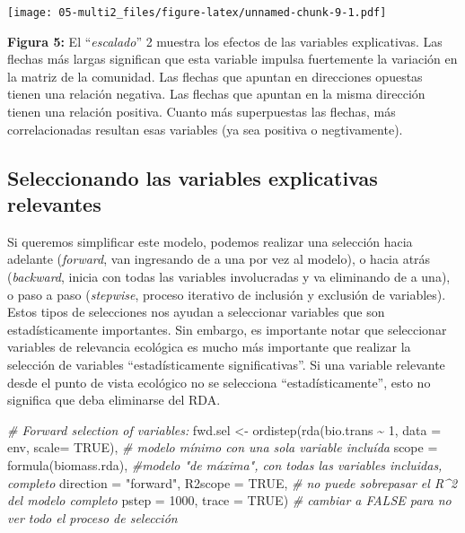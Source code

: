 \documentclass[
]{book}
\newenvironment{Shaded}{\begin{snugshade}}{\end{snugshade}}
\newcommand{\AttributeTok}[1]{\textcolor[rgb]{0.77,0.63,0.00}{#1}}
\newcommand{\CommentTok}[1]{\textcolor[rgb]{0.56,0.35,0.01}{\textit{#1}}}
\newcommand{\ConstantTok}[1]{\textcolor[rgb]{0.00,0.00,0.00}{#1}}
\newcommand{\DecValTok}[1]{\textcolor[rgb]{0.00,0.00,0.81}{#1}}
\newcommand{\FunctionTok}[1]{\textcolor[rgb]{0.00,0.00,0.00}{#1}}
\newcommand{\NormalTok}[1]{#1}
\newcommand{\OtherTok}[1]{\textcolor[rgb]{0.56,0.35,0.01}{#1}}
\newcommand{\SpecialCharTok}[1]{\textcolor[rgb]{0.00,0.00,0.00}{#1}}
\newcommand{\StringTok}[1]{\textcolor[rgb]{0.31,0.60,0.02}{#1}}
\begin{document}
\texttt{[image: 05-multi2\_files/figure-latex/unnamed-chunk-9-1.pdf]}

\textbf{Figura 5:} El ``\emph{escalado}'' 2 muestra los efectos de las variables explicativas. Las flechas más largas significan que esta variable impulsa fuertemente la variación en la matriz de la comunidad. Las flechas que apuntan en direcciones opuestas tienen una relación negativa. Las flechas que apuntan en la misma dirección tienen una relación positiva. Cuanto más superpuestas las flechas, más correlacionadas resultan esas variables (ya sea positiva o negtivamente).

\hypertarget{seleccionando-las-variables-explicativas-relevantes}{%
\subsection{Seleccionando las variables explicativas relevantes}\label{seleccionando-las-variables-explicativas-relevantes}}

Si queremos simplificar este modelo, podemos realizar una selección hacia adelante (\emph{forward}, van ingresando de a una por vez al modelo), o hacia atrás (\emph{backward}, inicia con todas las variables involucradas y va eliminando de a una), o paso a paso (\emph{stepwise}, proceso iterativo de inclusión y exclusión de variables). Estos tipos de selecciones nos ayudan a seleccionar variables que son estadísticamente importantes. Sin embargo, es importante notar que seleccionar variables de relevancia ecológica es mucho más importante que realizar la selección de variables ``estadísticamente significativas''. Si una variable relevante desde el punto de vista ecológico no se selecciona ``estadísticamente'', esto no significa que deba eliminarse del RDA.

\begin{Shaded}
\begin{Highlighting}[]
\CommentTok{\# Forward selection of variables:}
\NormalTok{fwd.sel }\OtherTok{\textless{}{-}} \FunctionTok{ordistep}\NormalTok{(}\FunctionTok{rda}\NormalTok{(bio.trans }\SpecialCharTok{\textasciitilde{}} \DecValTok{1}\NormalTok{, }\AttributeTok{data =}\NormalTok{ env, }\AttributeTok{scale=} \ConstantTok{TRUE}\NormalTok{), }\CommentTok{\# modelo mínimo con una sola variable incluída}
               \AttributeTok{scope =} \FunctionTok{formula}\NormalTok{(biomass.rda), }\CommentTok{\#modelo "de máxima", con todas las variables incluidas, completo}
               \AttributeTok{direction =} \StringTok{"forward"}\NormalTok{,}
               \AttributeTok{R2scope =} \ConstantTok{TRUE}\NormalTok{, }\CommentTok{\# no puede sobrepasar el R\^{}2 del modelo completo}
               \AttributeTok{pstep =} \DecValTok{1000}\NormalTok{,}
               \AttributeTok{trace =} \ConstantTok{TRUE}\NormalTok{) }\CommentTok{\# cambiar a FALSE para no ver todo el proceso de selección}
\end{Highlighting}
\end{Shaded}
\end{document}
